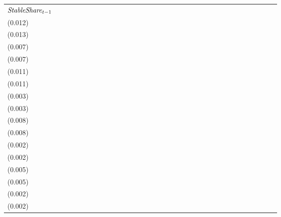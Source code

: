 \begin{tabular}{lllllllllllllllllllllllllllllllll}
${{\it StableShare}}_{t-1}$  &                                     &                                     &   \makecell{$0.505^{**}$ \\(0.012)} &   \makecell{$0.506^{**}$ \\(0.013)} &                                     &                                     &   \makecell{$0.091^{**}$ \\(0.007)} &  \makecell{$0.091^{**}$ \\(0.007)} &                                     &                                     &  \makecell{$-0.188^{**}$ \\(0.011)} &  \makecell{$-0.187^{**}$ \\(0.011)} &                                     &                                     &  \makecell{$-0.008^{**}$ \\(0.003)} &  \makecell{$-0.008^{**}$ \\(0.003)} &                                     &                                     &  \makecell{$-0.170^{**}$ \\(0.008)} &  \makecell{$-0.170^{**}$ \\(0.008)} &                                     &                                     &  \makecell{$-0.007^{**}$ \\(0.002)} &  \makecell{$-0.007^{**}$ \\(0.002)} &                                     &                                     &   \makecell{$0.206^{**}$ \\(0.005)} &  \makecell{$0.206^{**}$ \\(0.005)} &                                    &                                    &  \makecell{$0.023^{**}$ \\(0.002)} &  \makecell{$0.023^{**}$ \\(0.002)} \\

\end{tabular}
